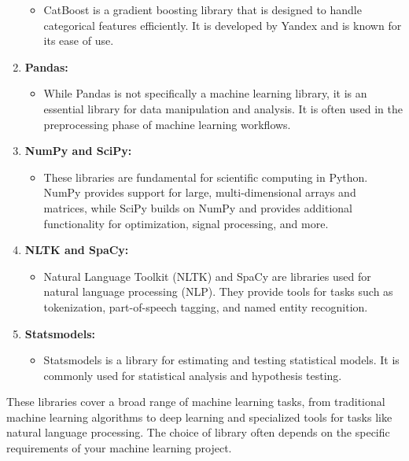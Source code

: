 \documentclass[
]{book}
\providecommand{\tightlist}{%
  \setlength{\itemsep}{0pt}\setlength{\parskip}{0pt}}
\begin{document}
\begin{enumerate}
  \begin{itemize}
  \tightlist
  \item
    CatBoost is a gradient boosting library that is designed to handle categorical features efficiently. It is developed by Yandex and is known for its ease of use.
  \end{itemize}
\item
  \textbf{Pandas:}

  \begin{itemize}
  \tightlist
  \item
    While Pandas is not specifically a machine learning library, it is an essential library for data manipulation and analysis. It is often used in the preprocessing phase of machine learning workflows.
  \end{itemize}
\item
  \textbf{NumPy and SciPy:}

  \begin{itemize}
  \tightlist
  \item
    These libraries are fundamental for scientific computing in Python. NumPy provides support for large, multi-dimensional arrays and matrices, while SciPy builds on NumPy and provides additional functionality for optimization, signal processing, and more.
  \end{itemize}
\item
  \textbf{NLTK and SpaCy:}

  \begin{itemize}
  \tightlist
  \item
    Natural Language Toolkit (NLTK) and SpaCy are libraries used for natural language processing (NLP). They provide tools for tasks such as tokenization, part-of-speech tagging, and named entity recognition.
  \end{itemize}
\item
  \textbf{Statsmodels:}

  \begin{itemize}
  \tightlist
  \item
    Statsmodels is a library for estimating and testing statistical models. It is commonly used for statistical analysis and hypothesis testing.
  \end{itemize}
\end{enumerate}

These libraries cover a broad range of machine learning tasks, from traditional machine learning algorithms to deep learning and specialized tools for tasks like natural language processing. The choice of library often depends on the specific requirements of your machine learning project.
\end{document}
